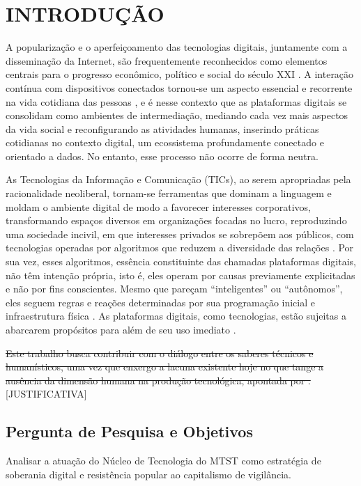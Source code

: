 




\chapter{INTRODUÇÃO}
\label{chap:introducao}

A popularização e o aperfeiçoamento das tecnologias digitais, juntamente com a disseminação da Internet, são frequentemente reconhecidos como elementos centrais para o progresso econômico, político e social do século XXI \cite{Silveira2021}. A interação contínua com dispositivos conectados tornou-se um aspecto essencial e recorrente na vida cotidiana das pessoas \cite{silveira-demcodigos}, e é nesse contexto que as plataformas digitais se consolidam como ambientes de intermediação, mediando cada vez mais aspectos da vida social e reconfigurando as atividades humanas, inserindo práticas cotidianas no contexto digital, um ecossistema profundamente conectado e orientado a dados. No entanto, esse processo não ocorre de forma neutra. 

As Tecnologias da Informação e Comunicação (TICs), ao serem apropriadas pela racionalidade neoliberal, tornam-se ferramentas que dominam a linguagem e moldam o ambiente digital de modo a favorecer interesses corporativos, transformando espaços diversos em organizações focadas no lucro, reproduzindo uma sociedade incivil, em que interesses privados se sobrepõem aos públicos, com tecnologias operadas por algoritmos que reduzem a diversidade das relações \cite{souza_sabbag_achilles_2024}. Por sua vez, esses algoritmos, essência constituinte das chamadas plataformas digitais, não têm intenção própria, isto é, eles operam por causas previamente explicitadas e não por fins conscientes. Mesmo que pareçam “inteligentes” ou “autônomos”, eles seguem regras e reações determinadas por sua programação inicial e infraestrutura física \cite{Faustino2023}. As plataformas digitais, como tecnologias, estão sujeitas a abarcarem propósitos para além de seu uso imediato \cite{Winner_2019}.

\sout{Este trabalho busca contribuir com o diálogo entre os saberes técnicos e humanísticos, uma vez que enxergo a lacuna existente hoje no que tange a ausência da dimensão humana na produção tecnológica, apontada por .} [JUSTIFICATIVA]

\section{Pergunta de Pesquisa e Objetivos}
\label{sec:perg}
Analisar a atuação do Núcleo de Tecnologia do MTST como estratégia de soberania digital e resistência popular ao capitalismo de vigilância.

